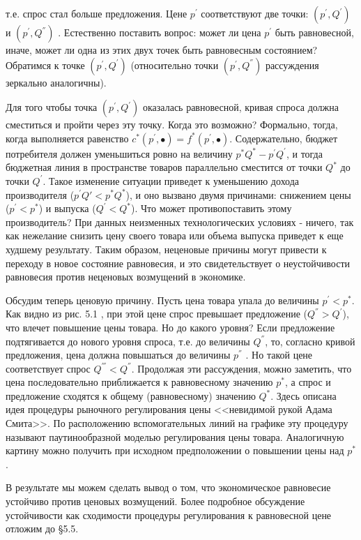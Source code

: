 \documentclass[12pt, 4paper]{book}
\begin{document}
{т.е. спрос стал больше предложения. Цене $p^{'}$ соответствуют две точки: $(p^{'},Q^{'})$ и $(p^{'},Q^{''})$ . Естественно поставить вопрос: может ли цена $p^{'}$ быть равновесной, иначе, может ли одна из этих двух точек быть равновесным состоянием? Обратимся к точке $(p^{'},Q^{'})$ (относительно точки $(p^{'},Q^{''})$ рассуждения зеркально аналогичны).
\par

Для того чтобы точка $(p^{'},Q^{'})$ оказалась равновесной, кривая спроса должна сместиться и пройти через эту точку. Когда это возможно? Формально, тогда, когда выполняется равенство $c^{*}(p^{'},\bullet)=f^{*}(p^{'},\bullet)$. Содержательно, бюджет потребителя должен уменьшиться ровно на величину $p^{*}Q^{*} - p^{'}Q^{'}$, и тогда бюджетная линия в пространстве товаров параллельно сместится от точки $Q^{*}$ до точки $Q^{'}$. Такое изменение ситуации приведет к уменьшению дохода производителя ($p^{'}Q{'}<p^{*}Q^{*}$), и оно вызвано двумя причинами: снижением цены ($p^{'}<p^{*}$) и выпуска ($Q^{'}< Q^{*}$). Что может противопоставить этому производитель? При данных неизменных технологических условиях - ничего, так как нежелание снизить цену своего товара или объема выпуска приведет к еще худшему результату. Таким образом, неценовые причины могут привести к переходу в новое состояние равновесия, и это свидетельствует о неустойчивости равновесия против неценовых возмущений в экономике.
\par

Обсудим теперь ценовую причину. Пусть цена товара упала до величины $p^{'} < p^{*}$. Как видно из рис. 5.1 , при этой цене спрос превышает предложение ($Q^{''} > Q^{'}$), что влечет повышение цены товара. Но до какого уровня? Если предложение подтягивается до нового уровня спроса, т.е. до величины $Q^{''}$, то, согласно кривой предложения, цена должна повышаться до величины $p^{''}$ . Но такой цене соответствует спрос $Q^{'''}<Q^{''}$. Продолжая эти рассуждения, можно заметить, что цена последовательно приближается к равновесному значению $p^{*}$, а спрос и предложение сходятся к общему (равновесному) значению $Q^{*}$. Здесь описана идея процедуры рыночного регулирования цены <<невидимой рукой Адама Смита>>. По расположению вспомогательных линий на графике эту процедуру называют паутинообразной моделью регулирования цены товара. Аналогичную картину можно получить при исходном предположении о повышении цены над $p^{*}$.
\par

В результате мы можем сделать вывод о том, что экономическое равновесие устойчиво против ценовых возмущений. Более подробное обсуждение устойчивости как сходимости процедуры регулирования к равновесной цене отложим до §5.5.
\par

}
\end{document}
